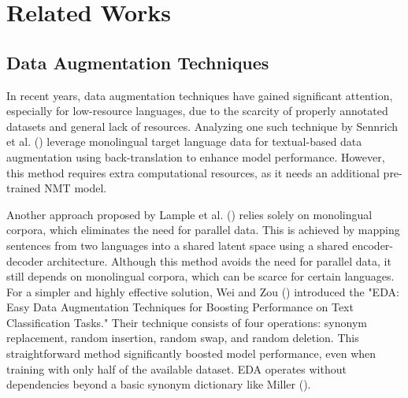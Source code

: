 \section{Related Works}
\subsection{Data Augmentation Techniques}
In recent years, data augmentation techniques have gained significant attention, especially for low-resource languages, due to the scarcity of properly annotated datasets and general lack of resources. Analyzing one such technique by Sennrich et al. (\citeyear{sennrich2016improvingneuralmachinetranslation}) leverage monolingual target language data for textual-based data augmentation using back-translation to enhance model performance. However, this method requires extra computational resources, as it needs an additional pre-trained NMT model.

Another approach proposed by  Lample et al. (\citeyear{lample2018unsupervisedmachinetranslationusing}) relies solely on monolingual corpora, which eliminates the need for parallel data. This is achieved by mapping sentences from two languages into a shared latent space using a shared encoder-decoder architecture. Although this method avoids the need for parallel data, it still depends on monolingual corpora, which can be scarce for certain languages. For a simpler and highly effective solution, Wei and Zou (\citeyear{wei2019edaeasydataaugmentation}) introduced the "EDA: Easy Data Augmentation Techniques for Boosting Performance on Text Classification Tasks." Their technique consists of four operations: synonym replacement, random insertion, random swap, and random deletion. This straightforward method significantly boosted model performance, even when training with only half of the available dataset. EDA operates without dependencies beyond a basic synonym dictionary like Miller (\citeyear{miller-1994-wordnet}).

